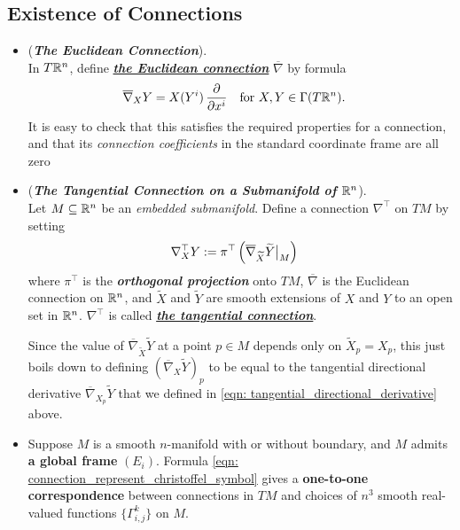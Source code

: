 \documentclass[11pt]{article}
\begin{document}
\subsection{Existence of Connections}
\begin{itemize}
\item \begin{example} (\emph{\textbf{The Euclidean Connection}}).\\
In $T{\mathbb R}^n$, define \underline{\emph{\textbf{the Euclidean connection}}} $\overline{\nabla}$ by formula 
\begin{align*}
\overline{\nabla}_{X}{Y} &=X(Y^i) \,\frac{\partial }{ \partial x^i}  &&\text{for }X, Y \in \Gamma(T{\mathbb R}^{n}).
\end{align*} It is easy to check that this satisfies the required properties for a connection, and that its \emph{connection coefficients} in the standard coordinate
frame are all zero
\end{example}

\item \begin{example} (\emph{\textbf{The Tangential Connection on a Submanifold of ${\mathbb R}^n$}}). \\
Let $M\subseteq {\mathbb R}^n$ be an \emph{embedded submanifold}. Define a connection $\nabla^{\top}$ on $TM$ by setting
\begin{align*}
\nabla_{X}^{\top}Y &:= \pi^{\top}\left(\overline{\nabla}_{\widetilde{X}}\widetilde{Y}\bigr|_{M}\right)
\end{align*} where $\pi^{\top}$ is the \emph{\textbf{orthogonal projection}} onto $TM$, $\overline{\nabla}$ is the Euclidean connection on ${\mathbb R}^n$, and $\widetilde{X}$ and $\widetilde{Y}$ are smooth extensions of $X$ and $Y$ to an open set in ${\mathbb R}^n$. $\nabla^{\top}$ is called \underline{\emph{\textbf{the tangential connection}}}. 

Since the value of $\overline{\nabla}_{\widetilde{X}}\widetilde{Y}$ at a point $p \in M$ depends only on $\widetilde{X}_p = X_p$, this just boils down to defining $(\overline{\nabla}_{X}\widetilde{Y})_{p}$ to be equal to the tangential directional derivative $\overline{\nabla}_{X_p}\widetilde{Y}$ that we defined in \eqref{eqn: tangential_directional_derivative} above.
\end{example}

\item \begin{lemma}
Suppose $M$ is a smooth $n$-manifold with or without boundary, and $M$ admits \textbf{a global frame} $(E_i)$. Formula \eqref{eqn: connection_represent_christoffel_symbol} gives a \textbf{one-to-one correspondence} between connections in $TM$ and choices of $n^3$ smooth real-valued functions $\{\Gamma_{i,j}^{k}\}$ on $M$.
\end{lemma}


\end{itemize}
\end{document}
